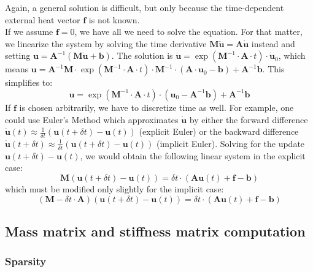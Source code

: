 \documentclass{IOS-Book-Article}
\theoremstyle{plain}
\theoremstyle{definition}
\begin{document}
Again, a general solution is difficult, but only because the time-dependent external heat vector $\mathbf f$ is not known.\\
If we assume $\mathbf f = 0$, we have all we need to solve the equation. For that matter, we linearize the system by solving the time derivative $\mathbf M \mathbf{\ddot u} = \mathbf A \mathbf{\dot u}$ instead and setting $\mathbf u = \mathbf A^{-1} ( \mathbf M \mathbf{\dot u} + \mathbf b )$. The solution is $\mathbf{\dot u} = \exp( \mathbf M^{-1} \cdot \mathbf A \cdot t) \cdot \mathbf{\dot u}_0$, which means $\mathbf u = \mathbf A^{-1} \mathbf M \cdot \exp ( \mathbf M^{-1} \cdot \mathbf A \cdot t ) \cdot \mathbf M^{-1} \cdot (\mathbf A \cdot \mathbf u_0 - \mathbf b)  + \mathbf A^{-1} \mathbf b$. This simplifies to:
\begin{equation}
	\mathbf u = \exp ( \mathbf M^{-1} \cdot \mathbf A \cdot t ) \cdot (\mathbf u_0 - \mathbf A^{-1} \mathbf b) + \mathbf A^{-1} \mathbf b
\end{equation}
If $\mathbf f$ is chosen arbitrarily, we have to discretize time as well. For example, one could use Euler's Method which approximates $\mathbf{\dot u}$ by either the forward difference $\mathbf{\dot u}(t) \approx \frac{1}{\delta t} (\mathbf u (t + \delta t) - \mathbf u (t))$ (explicit Euler) or the backward difference $\mathbf{\dot u}(t + \delta t) \approx \frac{1}{\delta t} (\mathbf u (t + \delta t) - \mathbf u (t))$ (implicit Euler). Solving for the update $\mathbf u(t + \delta t) - \mathbf u(t)$, we would obtain the following linear system in the explicit case:
\begin{equation}
	\mathbf M (\mathbf u(t + \delta t) - \mathbf u(t)) = \delta t \cdot (\mathbf A \mathbf{u} (t) + \mathbf f - \mathbf b)
\end{equation}
which must be modified only slightly for the implicit case:
\begin{equation}
	(\mathbf M - \delta t \cdot \mathbf A) (\mathbf u(t + \delta t) - \mathbf u(t)) = \delta t \cdot (\mathbf A \mathbf{u} (t) + \mathbf f - \mathbf b)
\end{equation}

\subsection{Mass matrix and stiffness matrix computation}

\subsubsection{Sparsity}
\end{document}
